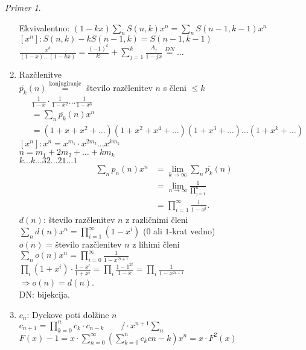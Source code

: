 \documentclass[a4paper, 12pt]{book}
\theoremstyle{definition}
\theoremstyle{remark}
\newtheorem*{ex}{Primer}
\begin{document}
\begin{ex}
\begin{enumerate}[label=(\arabic*)]
      Ekvivalentno: $(1-kx) \sum_n S(n,k) x^n = \sum_n S(n-1, k-1) x^n$ \\
      $[x^n]: S(n,k) - k S(n-1,k) = S(n-1, k-1)$ \\
      $\frac{x^k}{(1-x) \dots (1-kx)} = \frac{(-1)^k}{k!} + \sum_{j=1}^{k} \frac{A_j}{1-jx} \stackrel{DN}{=} \dots$
    \item Razčlenitve \\
      $\overline{p_k}(n) \stackrel{\text{konjugiranje}}{=}$ število razčlenitev $n$ s členi $\leq k$ \\
      \begin{align*}
        &\frac{1}{1-x} \cdot \frac{1}{1-x^2} \dots \frac{1}{1-x^k} \\
        &= \sum_n \overline{p_k}(n) x^n \\
        &= (1+x+x^2+\dots) (1+x^2+x^4+\dots) (1+x^3+\dots) \dots (1+x^k+\dots)
      \end{align*}
      $[x^n]: x^n = x^{m_1} \cdot x^{2 m_2} \dots x^{k m_k}$ \\
      $n = m_1 + 2 m_2 + \dots + k m_k$ \\
      $k \dots k \dots 3 2 \dots 2 1 \dots 1$ %
      \begin{align*}
        \sum_n p_n(n) x^n &= \lim_{k \to \infty} \sum_n \overline{p_k}(n) \\
        &= \lim_{n \to \infty} \frac{1}{\prod_{j=1}^{n}} \\
        &= \prod_{i=1}^{\infty} \frac{1}{1-x^i}.
      \end{align*}
      $d(n)$: število razčlenitev $n$ z različnimi členi \\
      $\sum_n d(n) x^n = \prod_{i=1}^{\infty} (1-x^i)$ ($0$ ali $1$-krat vedno) \\
      $o(n)$ = število razčlenitev $n$ z lihimi členi \\
      $\sum_n o(n) x^n = \prod_{i=0}^{\infty} \frac{1}{1-x^{2i + 1}}$ \\
      $\prod_i (1+x^i) \cdot \frac{1-x^i}{1+x^i} = \prod_{i} \frac{1-1^{2i}}{1-x} = \prod_i \frac{1}{1-x^{2i+1}}$ \\
      $\Longrightarrow o(n) = d(n)$. \\
      DN: bijekcija.
    \item $c_n$: Dyckove poti dolžine $n$ \\
      $c_{n+1} = \prod_{k=0}^n c_k \cdot c_{n-k} \qquad / \cdot x^{n+1} \sum_n$ \\
      $F(x) - 1 = x \cdot \sum_{n=0}^{\infty} \left(\sum_{k=0}^{n} c_k c{n-k}\right) x^n = x \cdot F^2(x)$ \\

\end{enumerate}
\end{ex}
\end{document}
